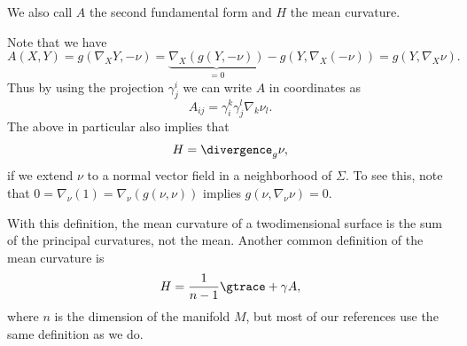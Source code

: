 \documentclass[titlepage,numbers=noenddot,oneside,%
cleardoublepage=empty,paper=a4,fontsize=11pt,%
english,%
]{scrartcl}
\begin{document}
{\begin{definition}
\begin{equation}
    \end{equation}
    We also call \( A \) the second fundamental form and \( H \) the mean curvature. 
\end{definition}
Note that we have
\begin{equation*}
    A(X,Y)=g(\nabla_X Y,-\nu)=\underbrace{\nabla_X (g(Y,-\nu))}_{=0}-g(Y,\nabla_X (-\nu))=g(Y,\nabla_X \nu).
\end{equation*}
Thus by using the projection \( \gamma^i_j \) we can write \( A \) in coordinates as
\begin{equation}
    A_{ij}=\gamma^k_i\gamma^l_j \nabla_k \nu_l.\label{eq:second_fundamental_form_in_coordinates}
\end{equation}
The above in particular also implies that
\begin{equation*}
    H=\divergence_g \nu,
\end{equation*}
if we extend \( \nu \) to a normal vector field in a neighborhood of \( \Sigma \). To see this, note that \( 0=\nabla_\nu(1)=\nabla_{\nu}(g(\nu,\nu)) \) implies \( g(\nu,\nabla_\nu \nu)=0 \).
\begin{remark}\label{rem:mean_curvature_peculiarities}
    With this definition, the mean curvature of a twodimensional surface is the sum of the principal curvatures, not the mean. Another common definition of the mean curvature is
    \begin{equation*}
        H=\frac{1}{n-1}\gtrace+{\gamma}{A},
    \end{equation*}
    where \( n \) is the dimension of the manifold \( M \), but most of our references use the same definition as we do.


\end{remark}}
\end{document}
